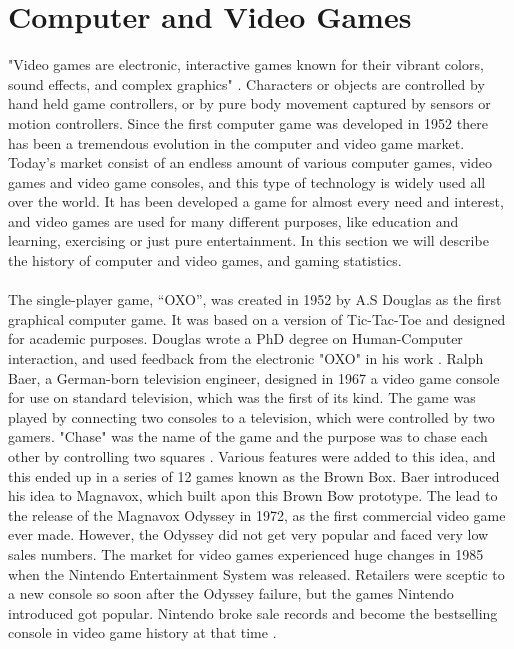 \section{Computer and Video Games}
"Video games are electronic, interactive games known for their vibrant colors, sound effects, and complex graphics" \cite{videogamedef}. Characters or objects are controlled by hand held game controllers, or by pure body movement captured by sensors or motion controllers. Since the first computer game was developed in 1952 there has been a tremendous evolution in the computer and video game market. Today's market consist of an endless amount of various computer games, video games and video game consoles, and this type of technology is widely used all over the world. It has been developed a game for almost every need and interest, and video games are used for many different purposes, like education and learning, exercising or just pure entertainment. In this section we will describe the history of computer and video games, and gaming statistics. \\ \\
The single-player game, “OXO”, was created in 1952 by A.S Douglas as the first graphical computer game. It was based on a version of Tic-Tac-Toe and designed for academic purposes.  Douglas wrote a PhD degree on Human-Computer interaction, and used feedback from the electronic "OXO" in his work \cite{abouthiginbotham}. Ralph Baer, a German-born television engineer, designed in 1967 a video game console for use on standard television, which was the first of its kind. The game was played by connecting two consoles to a television, which were controlled by two gamers. "Chase" was the name of the game and the purpose was to chase each other by controlling two squares \cite{videogameHistory}. Various features were added to this idea, and this ended up in a series of 12 games known as the Brown Box. Baer introduced his idea to Magnavox, which built apon this Brown Bow prototype. The lead to the release of the Magnavox Odyssey in 1972, as the first commercial video game ever made. However, the Odyssey did not get very popular and faced very low sales numbers. The market for video games experienced huge changes in 1985 when the Nintendo Entertainment System was released. Retailers were sceptic to a new console so soon after the Odyssey failure, but the games Nintendo introduced got popular. Nintendo broke sale records and become the bestselling console in video game history at that time \cite{consoleHistory}. \\ \\
